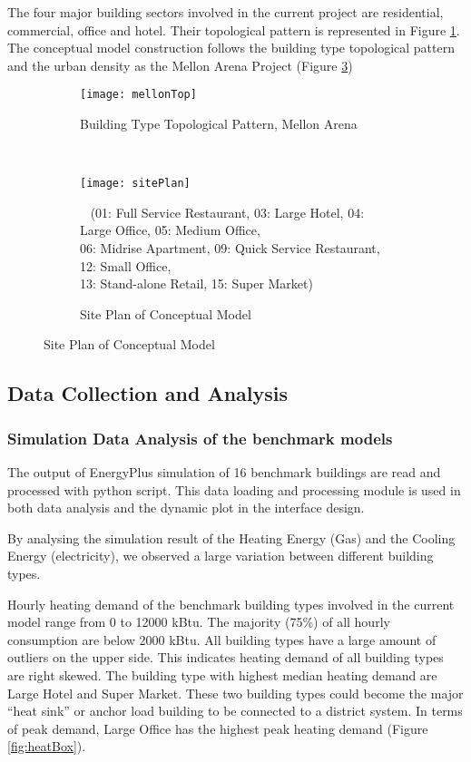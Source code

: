 \documentclass[hidelinks,12pt]{article}
\newcommand{\fref}[1]{Figure \ref{#1}}
\begin{document}
The four major building sectors involved in the current project are
residential, commercial, office and hotel. Their topological pattern
is represented in Figure \ref{fig:mellonTop}. The conceptual model
construction follows the building type topological pattern and the
urban density as the Mellon Arena Project (\fref{fig:sitePlan})
\begin{figure}[h!]
  \centering
  \begin{subfigure}
  \centering
  \texttt{[image: mellonTop]}
  \caption{Building Type Topological Pattern, Mellon Arena}
  \label{fig:mellonTop}
  \end{subfigure}
  ~
  \begin{subfigure}
  \centering
  \texttt{[image: sitePlan]}
  \caption{Site Plan of Conceptual Model}~ (01: Full Service
  Restaurant, 03: Large Hotel, 04: Large Office, 05: Medium Office,
  \\06: Midrise Apartment, 09: Quick Service Restaurant, 12: Small
  Office, \\13: Stand-alone Retail, 15: Super Market)
  \label{fig:sitePlan}
  \end{subfigure}
\end{figure}   

\subsection{Data Collection and Analysis}
\subsubsection{Simulation Data Analysis of the benchmark
  models}\label{boxPlot}
The output of EnergyPlus simulation of 16 benchmark buildings are read
and processed with python script. This data loading and processing
module is used in both data analysis and the dynamic plot in the
interface design.

By analysing the simulation result of the Heating Energy (Gas) and the
Cooling Energy (electricity), we observed a large variation between
different building types.

Hourly heating demand of the benchmark building types involved in the
current model range from 0 to 12000 kBtu. The majority (75\%) of all
hourly consumption are below 2000 kBtu. All building types have a
large amount of outliers on the upper side. This indicates heating
demand of all building types are right skewed. The building type with
highest median heating demand are Large Hotel and Super Market. These
two building types could become the major ``heat sink'' or anchor load
building to be connected to a district system. In terms of peak
demand, Large Office has the highest peak heating demand
(\fref{fig:heatBox}).
\end{document}
